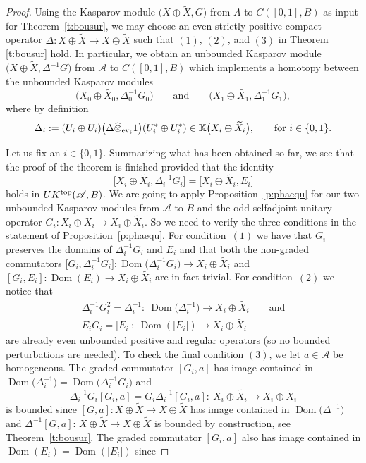 \documentclass[pdftex]{sigma}
\numberwithin{equation}{section}
\newcommand{\hot}{\widehat \otimes}
\newcommand{\op}{\oplus}
\newcommand{\De}{\Delta}
\newcommand{\s}[1]{\mathscr{#1}}
\newcommand{\B}[1]{\mathbb{#1}}
\newcommand{\wit}{\widetilde}
\begin{document}
\begin{proof}
Using the Kasparov module $\big(X \op \wit X, G\big)$ from $A$ to $C([0,1],B)$ as input for Theorem~\ref{t:bousur}, we may choose an even strictly positive compact operator $\De\colon X \op \wit X \to X \op \wit X$ such that $(1)$, $(2)$, and $(3)$ in Theorem \ref{t:bousur} hold. In particular, we obtain an unbounded Kasparov module $\big( X \op \wit X, \De^{-1}G\big)$ from $\s A$ to $C([0,1],B)$ which implements a homotopy between the unbounded Kasparov modules
\[
\big(X_0 \op \wit{X_0}, \De_0^{-1} G_0\big) \qquad \text{and} \qquad \big(X_1 \op \wit{X_1}, \De_1^{-1} G_1\big) ,
\]
where by definition
\[
\De_i := (U_i \op U_i) \big(\De \hot_{{\rm ev}_i} 1 \big) (U_i^* \op U_i^*) \in \B K\big( X_i \op \wit X_i\big) , \qquad \text{for } i \in \{0,1\} .
\]

Let us fix an $i \in \{0,1\}$. Summarizing what has been obtained so far, we see that the proof of the theorem is finished provided that the identity
\[
\big[X_i \op \wit{X_i}, \De_i^{-1} G_i\big] = \big[ X_i \op \wit{X_i}, E_i\big]
\]
holds in $UK^{{\rm top}}(\s A,B)$. We are going to apply Proposition~\ref{p:phaequ} for our two unbounded Kasparov modules from $\s A$ to $B$ and the odd selfadjoint unitary operator $G_i\colon X_i \op \wit X_i \to X_i \op \wit X_i$. So we need to verify the three conditions in the statement of Proposition~\ref{p:phaequ}. For condition~$(1)$ we have that $G_i$ preserves the domains of $\De_i^{-1} G_i$ and $E_i$ and that both the non-graded commutators $\big[G_i, \De_i^{-1} G_i\big]\colon \operatorname{Dom}\big(\De_i^{-1} G_i\big) \to X_i \op \wit{X_i}$ and $[G_i, E_i]\colon \operatorname{Dom}(E_i) \to X_i \op \wit{X_i}$ are in fact trivial. For condition~$(2)$ we notice that
\begin{gather*}
 \De_i^{-1} G_i^2 = \De_i^{-1}\colon \ \operatorname{Dom}\big(\De_i^{-1}\big) \to X_i \op \wit{X_i} \qquad \text{and} \\
 E_i G_i = |E_i|\colon \ \operatorname{Dom}(|E_i|) \to X_i \op \wit{X_i}
\end{gather*}
are already even unbounded positive and regular operators (so no bounded perturbations are needed). To check the final condition $(3)$, we let $a \in \s A$ be homogeneous. The graded commutator $[G_i,a]$ has image contained in $\operatorname{Dom}\big(\De_i^{-1}\big) = \operatorname{Dom}\big(\De_i^{-1} G_i\big)$ and
\[
\De_i^{-1} G_i [G_i,a] = G_i \De_i^{-1} [G_i,a]\colon\ X_i \op \wit{X_i} \to X_i \op \wit{X_i}
\]
is bounded since $[G,a]\colon X \op \wit X \to X \op \wit X$ has image contained in $\operatorname{Dom}\big(\De^{-1}\big)$ and $\De^{-1} [G,a]$: $X \op \wit X \to X \op \wit X$ is bounded by construction, see Theorem~\ref{t:bousur}. The graded commutator $[G_i,a]$ also has image contained in $\operatorname{Dom}(E_i) = \operatorname{Dom}(|E_i|)$ since

\end{proof}
\end{document}
